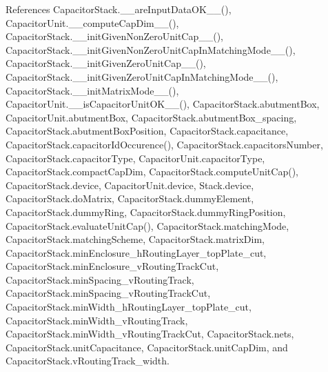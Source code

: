 References Capacitor\-Stack.\-\_\-\-\_\-are\-Input\-Data\-O\-K\-\_\-\-\_\-(), Capacitor\-Unit.\-\_\-\-\_\-compute\-Cap\-Dim\-\_\-\-\_\-(), Capacitor\-Stack.\-\_\-\-\_\-init\-Given\-Non\-Zero\-Unit\-Cap\-\_\-\-\_\-(), Capacitor\-Stack.\-\_\-\-\_\-init\-Given\-Non\-Zero\-Unit\-Cap\-In\-Matching\-Mode\-\_\-\-\_\-(), Capacitor\-Stack.\-\_\-\-\_\-init\-Given\-Zero\-Unit\-Cap\-\_\-\-\_\-(), Capacitor\-Stack.\-\_\-\-\_\-init\-Given\-Zero\-Unit\-Cap\-In\-Matching\-Mode\-\_\-\-\_\-(), Capacitor\-Stack.\-\_\-\-\_\-init\-Matrix\-Mode\-\_\-\-\_\-(), Capacitor\-Unit.\-\_\-\-\_\-is\-Capacitor\-Unit\-O\-K\-\_\-\-\_\-(), Capacitor\-Stack.\-abutment\-Box, Capacitor\-Unit.\-abutment\-Box, Capacitor\-Stack.\-abutment\-Box\-\_\-spacing, Capacitor\-Stack.\-abutment\-Box\-Position, Capacitor\-Stack.\-capacitance, Capacitor\-Stack.\-capacitor\-Id\-Occurence(), Capacitor\-Stack.\-capacitors\-Number, Capacitor\-Stack.\-capacitor\-Type, Capacitor\-Unit.\-capacitor\-Type, Capacitor\-Stack.\-compact\-Cap\-Dim, Capacitor\-Stack.\-compute\-Unit\-Cap(), Capacitor\-Stack.\-device, Capacitor\-Unit.\-device, Stack.\-device, Capacitor\-Stack.\-do\-Matrix, Capacitor\-Stack.\-dummy\-Element, Capacitor\-Stack.\-dummy\-Ring, Capacitor\-Stack.\-dummy\-Ring\-Position, Capacitor\-Stack.\-evaluate\-Unit\-Cap(), Capacitor\-Stack.\-matching\-Mode, Capacitor\-Stack.\-matching\-Scheme, Capacitor\-Stack.\-matrix\-Dim, Capacitor\-Stack.\-min\-Enclosure\-\_\-h\-Routing\-Layer\-\_\-top\-Plate\-\_\-cut, Capacitor\-Stack.\-min\-Enclosure\-\_\-v\-Routing\-Track\-Cut, Capacitor\-Stack.\-min\-Spacing\-\_\-v\-Routing\-Track, Capacitor\-Stack.\-min\-Spacing\-\_\-v\-Routing\-Track\-Cut, Capacitor\-Stack.\-min\-Width\-\_\-h\-Routing\-Layer\-\_\-top\-Plate\-\_\-cut, Capacitor\-Stack.\-min\-Width\-\_\-v\-Routing\-Track, Capacitor\-Stack.\-min\-Width\-\_\-v\-Routing\-Track\-Cut, Capacitor\-Stack.\-nets, Capacitor\-Stack.\-unit\-Capacitance, Capacitor\-Stack.\-unit\-Cap\-Dim, and Capacitor\-Stack.\-v\-Routing\-Track\-\_\-width.



